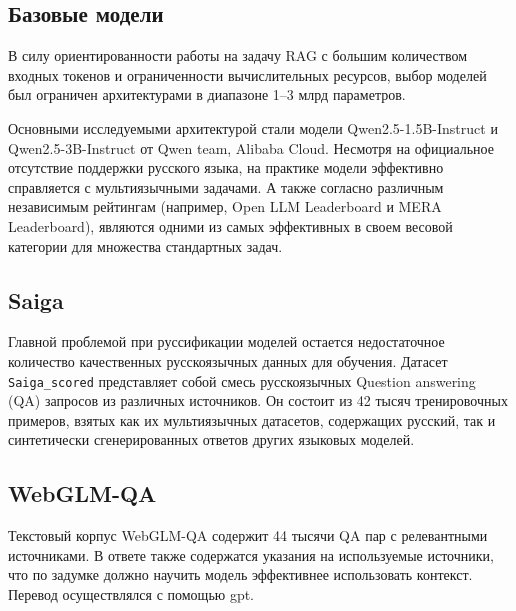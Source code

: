 \subsection{Базовые модели}
\label{subsec:base_models} 

В силу ориентированности работы на задачу RAG с большим количеством входных токенов и ограниченности вычислительных ресурсов, выбор моделей был ограничен архитектурами в диапазоне 1–3 млрд параметров.

Основными исследуемыми архитектурой стали модели Qwen2.5-1.5B-Instruct и Qwen2.5-3B-Instruct от Qwen team, Alibaba Cloud. Несмотря на официальное отсутствие поддержки русского языка, на практике модели эффективно справляется с мультиязычными задачами. А также согласно различным независимым рейтингам (например, Open LLM Leaderboard и MERA Leaderboard), являются одними из самых эффективных в своем весовой категории для множества стандартных задач.



\subsection{Saiga}
\label{subsec:saiga} 

Главной проблемой при руссификации моделей остается недостаточное количество качественных русскоязычных данных для обучения. Датасет \\ \verb|Saiga_scored| представляет собой смесь русскоязычных Question answering (QA) запросов из различных источников. Он состоит из 42 тысяч тренировочных примеров, взятых как их мультиязычных датасетов, содержащих русский, так и синтетически сгенерированных ответов других языковых моделей.  

\subsection{WebGLM-QA}
\label{subsec:webglm} 

Текстовый корпус WebGLM-QA содержит 44 тысячи QA пар с релевантными источниками. В ответе также содержатся указания на используемые источники, что по задумке должно научить модель эффективнее использовать контекст. Перевод осуществлялся с помощью gpt.

